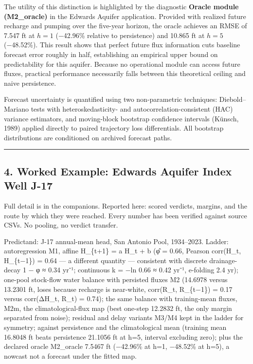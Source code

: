 \documentclass[11pt]{article}
\begin{document}
The utility of this distinction is highlighted by the diagnostic
\textbf{Oracle module (M2\_oracle)} in the Edwards Aquifer application.
Provided with realized future recharge and pumping over the five-year
horizon, the oracle achieves an RMSE of 7.547 ft at \(h = 1\) (−42.96\%
relative to persistence) and 10.865 ft at \(h = 5\) (−48.52\%). This
result shows that perfect future flux information cuts baseline forecast
error roughly in half, establishing an empirical upper bound on
predictability for this aquifer. Because no operational module can
access future fluxes, practical performance necessarily falls between
this theoretical ceiling and naive persistence.

Forecast uncertainty is quantified using two non-parametric techniques:
Diebold--Mariano tests with heteroskedasticity- and
autocorrelation-consistent (HAC) variance estimators, and moving-block
bootstrap confidence intervals (Künsch, 1989) applied directly to paired
trajectory loss differentials. All bootstrap distributions are
conditioned on archived forecast paths.

\begin{center}\rule{0.5\linewidth}{0.5pt}\end{center}

\subsection{4. Worked Example: Edwards Aquifer Index Well
J-17}\label{worked-example-edwards-aquifer-index-well-j-17}

Full detail is in the companions. Reported here: scored verdicts,
margins, and the route by which they were reached. Every number has been
verified against source CSVs. No pooling, no verdict transfer.

Predictand: J-17 annual-mean head, San Antonio Pool, 1934--2023. Ladder:
autoregression M1, affine H\_\{t+1\} = a H\_t + b (φ̂ = 0.66, Pearson
corr(H\_t, H\_\{t−1\}) = 0.64 --- a different quantity --- consistent
with discrete drainage-decay 1 − φ ≈ 0.34 yr⁻¹; continuous k = −ln 0.66
≈ 0.42 yr⁻¹, e-folding 2.4 yr); one-pool stock-flow water balance with
persisted fluxes M2 (14.6978 versus 13.2301 ft, loses because recharge
is near-white, corr(R\_t, R\_\{t−1\}) = 0.17 versus corr(ΔH\_t, R\_t) =
0.74); the same balance with training-mean fluxes, M2m, the
climatological-flux map (best one-step 12.2832 ft, the only margin
separated from noise); residual and delay variants M3/M4 kept in the
ladder for symmetry; against persistence and the climatological mean
(training mean 16.8048 ft beats persistence 21.1056 ft at h=5, interval
excluding zero); plus the declared oracle M2\_oracle 7.5467 ft (−42.96\%
at h=1, −48.52\% at h=5), a nowcast not a forecast under the fitted map.
\end{document}
